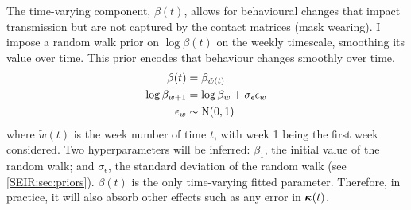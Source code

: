 \documentclass[thesis.tex]{subfiles}
\begin{document}
The time-varying component, $\beta(t)$, allows for behavioural changes that impact transmission but are not captured by the contact matrices (\eg mask wearing).
I impose a random walk prior on $\log\beta(t)$ on the weekly timescale, smoothing its value over time.
This prior encodes that behaviour changes smoothly over time.
\begin{align}
    \beta(t) &= \beta_{\tilde{w}(t)} \\
    \log\beta_{w+1} &= \log\beta_w + \sigma_\epsilon \epsilon_w \\
    \epsilon_w &\sim \operatorname{N}(0, 1)
\end{align}
where $\tilde{w}(t)$ is the week number of time $t$, with week 1 being the first week considered.
Two hyperparameters will be inferred: $\beta_1$, the initial value of the random walk; and $\sigma_\epsilon$, the standard deviation of the random walk (see \cref{SEIR:sec:priors}).
$\beta(t)$ is the only time-varying fitted parameter.
Therefore, in practice, it will also absorb other effects such as any error in $\bm{\kappa}(t)$.


\end{document}
